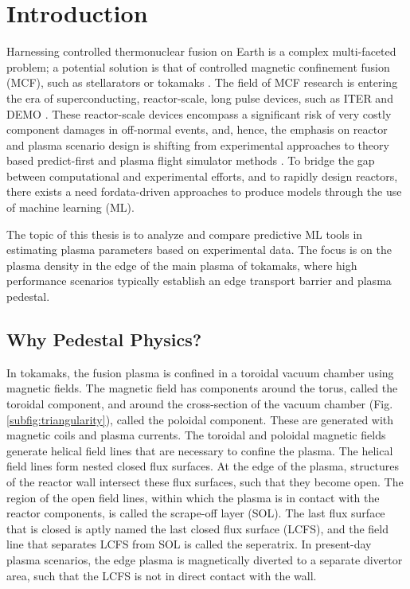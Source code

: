 \documentclass[a4paper, twoside, final, 12pt]{article}
\begin{document}
\section{Introduction}\label{sec:introduction}
Harnessing controlled thermonuclear fusion on Earth is a complex multi-faceted problem; a potential solution is that of controlled magnetic confinement fusion (MCF), such as stellarators or tokamaks \cite{EUROfusionroadmap}. 
The field of MCF research is entering the era of superconducting, reactor-scale, long pulse devices, such as ITER and DEMO \cite{Ikeda_2007, stepladder}.
These reactor-scale devices encompass a significant risk of very costly component damages in off-normal events, and, hence, the emphasis on reactor and plasma scenario design is shifting from experimental approaches to theory based predict-first and plasma flight simulator methods \cite{Meneghini_2017, MOREAU2011535}.
To  bridge  the  gap  between computational and experimental efforts, and to rapidly design reactors, there exists a need fordata-driven approaches to produce models through the use of machine learning (ML). 

The topic of this thesis is to analyze and compare predictive ML tools in estimating plasma parameters based on experimental data. The focus is on the plasma density in the edge of the main plasma of tokamaks, where high performance scenarios typically establish an edge transport barrier and plasma pedestal. 

\subsection{Why Pedestal Physics?}\label{subsec:purpose}
In tokamaks, the fusion plasma is confined in a toroidal vacuum chamber using magnetic fields.
The magnetic field has components around the torus, called the toroidal component, and around the cross-section of the vacuum chamber (Fig. \ref{subfig:triangularity}), called the poloidal component.
These are generated with magnetic coils and plasma currents.
The toroidal and poloidal magnetic fields generate helical field lines that are necessary to confine the plasma.
The helical field lines form nested closed flux surfaces.
At the edge of the plasma, structures of the reactor wall intersect these flux surfaces, such that they become open.
The region of the open field lines, within which the plasma is in contact with the reactor components, is called the scrape-off layer (SOL).
The last flux surface that is closed is aptly named the last closed flux surface (LCFS), and the field line that separates LCFS from SOL is called the seperatrix.
In present-day plasma scenarios, the edge plasma is magnetically diverted to a separate divertor area, such that the LCFS is not in direct contact with the wall.
\end{document}
